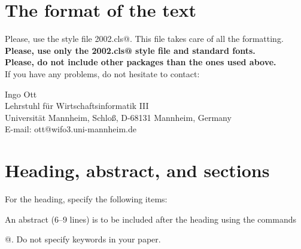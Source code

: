 \documentclass[runningheads]{d:/latex/gfkl2002}
\begin{document}
\section{The format of the text}
Please, use the style file \verb@gfkl2002.cls@. This file takes care of 
all the formatting.\\
{\bf Please, use only the \verb@gfkl2002.cls@ style file and standard
fonts.\\
Please, do not include other packages than the ones used above.}\\
If you have any problems, do not hesitate to
contact:
\begin{center}
Ingo Ott\\
Lehrstuhl f\"ur Wirtschaftsinformatik III\\
Universit\"at Mannheim, Schlo\ss, D-68131 Mannheim, Germany\\
E-mail: ott@wifo3.uni-mannheim.de\\
\end{center}

\section{Heading, abstract, and sections}
For the heading, specify the following items: 
An abstract (6--9 lines) is to be included after the heading using the 
commands \verb@\begin{abstract} ... \end{abstract}@. Do not specify 
keywords in your paper.
\end{document}

